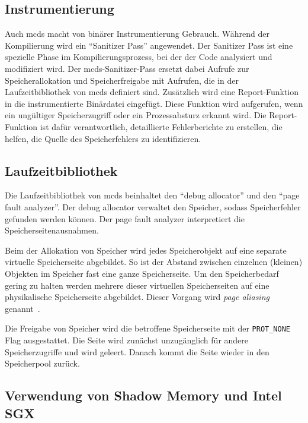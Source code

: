 \documentclass[acmtog,nonacm]{acmart}
\begin{document}
\subsection{Instrumentierung}

Auch mcds macht von binärer Instrumentierung Gebrauch. Während der Kompilierung
wird ein "`Sanitizer Pass"' angewendet. Der Sanitizer Pass ist eine spezielle
Phase im Kompilierungsprozess, bei der der Code analysiert und modifiziert
wird. Der mcds-Sanitizer-Pass ersetzt dabei Aufrufe zur Speicherallokation und
Speicherfreigabe mit Aufrufen, die in der Laufzeitbibliothek von mcds definiert
sind. Zusätzlich wird eine Report-Funktion in die instrumentierte Binärdatei
eingefügt. Diese Funktion wird aufgerufen, wenn ein ungültiger Speicherzugriff
oder ein Prozessabsturz erkannt wird. Die Report-Funktion ist dafür
verantwortlich, detaillierte Fehlerberichte zu erstellen, die helfen, die
Quelle des Speicherfehlers zu identifizieren.

\subsection{Laufzeitbibliothek}

Die Laufzeitbibliothek von mcds beinhaltet den "`debug allocator"' und den
"`page fault analyzer"'. Der debug allocator verwaltet den Speicher, sodass
Speicherfehler gefunden werden können. Der page fault analyzer interpretiert
die Speicherseitenausnahmen.

Beim der Allokation von Speicher wird jedes Speicherobjekt auf eine separate
virtuelle Speicherseite abgebildet. So ist der Abstand zwischen einzelnen
(kleinen) Objekten im Speicher fast eine ganze Speicherseite. Um den
Speicherbedarf gering zu halten werden mehrere dieser virtuellen Speicherseiten
auf eine physikalische Speicherseite abgebildet. Dieser Vorgang wird
\textit{page aliasing} genannt~\cite{mcds_2023}.

Die Freigabe von Speicher wird die betroffene Speicherseite mit der
\verb|PROT_NONE| Flag ausgestattet. Die Seite wird zunächst unzugänglich für
andere Speicherzugriffe und wird geleert. Danach kommt die Seite wieder in den
Speicherpool zurück.

\subsection{Verwendung von Shadow Memory und Intel SGX}
\end{document}
